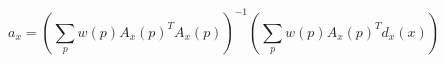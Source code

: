 \footnotesize
\begin{equation}
    \label{eq:optimal-parameter-affine-weighted-halved}
    a_x = \left (\sum_p w(p) A_x(p)^T A_x(p) \right )^{-1} \left (\sum_p w(p) A_x(p)^T d_x(x) \right)
\end{equation}